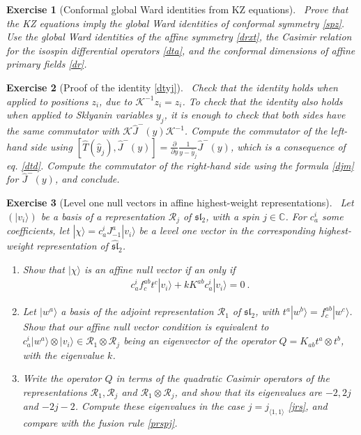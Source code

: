 \documentclass[12pt, a4paper, notitlepage, twoside]{report}
\numberwithin{equation}{section}
\theoremstyle{break}
\newtheorem{exo}{Exercise}[chapter]
\begin{document}
\begin{exo}[Conformal global Ward identities from KZ equations]
 ~\label{exokz}
 Prove that the KZ equations imply the global Ward identities of conformal symmetry \eqref{spz}.
 Use the global Ward identities of the affine symmetry \eqref{drxt}, the Casimir relation for the isospin differential operators \eqref{dta}, and the conformal dimensions of affine primary fields \eqref{dr}. 
\end{exo}


\begin{exo}[Proof of the identity \eqref{dtyj}]
 ~\label{exoktk}
Check that the identity holds when applied to positions $z_i$, due to $\mathcal{K}^{-1}z_i = z_i$. 
To check that the identity also holds when applied to Sklyanin variables $y_j$, it is enough to check 
that both sides have the same commutator with $\mathcal{K}\hat{J}^-(y)\mathcal{K}^{-1}$. 
Compute the commutator of the left-hand side using $[\hat{T}(\hat{y}_j),\hat{J}^-(y)]={\frac{\partial}{\partial y}}\frac{1}{y-\hat{y}_j}\hat{J}^-(y)$, which is a consequence of eq. \eqref{dtd}.
Compute the commutator of the 
right-hand side using the formula \eqref{djm} for $\hat{J}^-(y)$, and conclude.
\end{exo}

\begin{exo}[Level one null vectors in affine highest-weight representations]
 ~\label{exolos}
 Let $(|v_i\rangle)$ be a basis of a representation $\mathcal{R}_j$ of $\mathfrak{sl}_2$, with a spin $j\in\mathbb{C}$. For $c_a^i$ some coefficients, let $|\chi\rangle =  c_a^i J_{-1}^a|v_i\rangle$ be a level one vector in the corresponding highest-weight representation of $\widehat{\mathfrak{sl}}_2$.
 \begin{enumerate}
  \item Show that $|\chi \rangle $ is an affine null vector if an only if 
  \begin{align}
    c_a^i f^{ab}_c t^c|v_i\rangle + k K^{ab} c_a^i |v_i\rangle = 0\ .
  \end{align}
  \item Let $|w^a\rangle$ a basis of the adjoint representation $\mathcal{R}_1$ of $\mathfrak{sl}_2$, with $t^a|w^b\rangle = f^{ab}_c|w^c\rangle$. Show that our affine null vector condition is equivalent to $c_a^i|w^a\rangle\otimes |v_i\rangle\in \mathcal{R}_1\otimes \mathcal{R}_j$ being an eigenvector of the operator $Q=K_{ab}t^a\otimes t^b$, with the eigenvalue $k$.
  \item Write the operator $Q$ in terms of the quadratic Casimir operators of the representations $\mathcal{R}_1, \mathcal{R}_j$ and $\mathcal{R}_1\otimes \mathcal{R}_j$, and show that its eigenvalues are $-2, 2j$ and $-2j-2$. 
  Compute these eigenvalues in the case $j=j_{\langle 1,1\rangle}$ \eqref{jrs}, and compare with the fusion rule \eqref{prspj}.
 \end{enumerate}
\end{exo}
\end{document}
